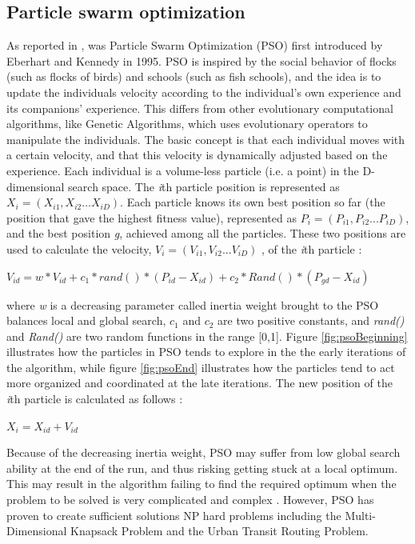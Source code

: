 \subsection{Particle swarm optimization}
\label{subsec:pso}
As reported in \citet{shi99}, was Particle Swarm Optimization (PSO) first introduced by Eberhart and Kennedy in 1995. PSO is inspired by the social behavior of flocks (such as flocks of birds) and schools (such as fish schools), and the idea is to update the individuals velocity according to the individual's own experience and its companions' experience. This differs from other evolutionary computational algorithms, like Genetic Algorithms, which uses evolutionary operators to manipulate the individuals. The basic concept is that each individual moves with a certain velocity, and that this velocity is dynamically adjusted based on the experience. Each individual is a volume-less particle (i.e. a point) in the D-dimensional search space. The \textit{i}th particle position is represented as $X_i = (X_{i1},X_{i2}...X_{iD})$. Each particle knows its own best position so far (the position that gave the highest fitness value), represented as $P_i = (P_{i1},P_{i2}...P_{iD})$, and the best position \textit{g}, achieved among all the particles. These two positions are used to calculate the velocity, $V_i = (V_{i1},V_{i2}...V_{iD})$ ,  of the \textit{i}th particle \citep{shi99}: 
\newline
\newline
\centerline{$V_{id} = w * V_{id} + c_1 * rand() * (P_{id}-X_{id}) + c_2 * Rand() * (P_{gd}-X_{id})$}
\newline
\newline
where \textit{w} is a decreasing parameter called inertia weight brought to the PSO balances local and global search, $c_1$ and $c_2$ are two positive constants, and \textit{rand()} and \textit{Rand()} are two random functions in the range [0,1]. Figure \ref{fig:psoBeginning} illustrates how the particles in PSO tends to explore in the the early iterations of the algorithm, while figure \ref{fig:psoEnd} illustrates how the particles tend to act more organized and coordinated at the late iterations. The new position of the \textit{i}th particle is calculated as follows \cite{shi99}:
\newline
\newline
\centerline{$X_i = X_{id} + V_{id}$}
\newline
\newline
Because of the decreasing inertia weight, PSO may suffer from low global search ability at the end of the run, and thus risking getting stuck at a local optimum. This may result in the algorithm failing to find the required optimum when the problem to be solved is very complicated and complex \cite{shi99}. However, PSO has proven to create sufficient solutions NP hard problems including the Multi-Dimensional Knapsack Problem\cite{wan09} and the Urban Transit Routing Problem\cite{kechagiopoulos14}. 

